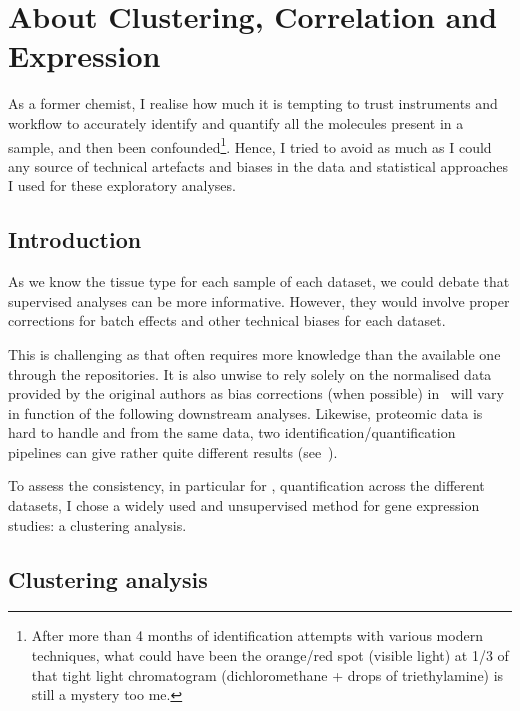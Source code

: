 \chapter{About Clustering, Correlation and Expression}
\label{ch:expression}

\begin{comment}
\setlength{\epigraphwidth}{0.45\textwidth}
\setlength{\epigraphrule}{0.1pt}
\epigraph{Quantifier: c'est convenir, puis mesurer.}{\cite{Desrosieres}}
\end{comment}

As a former chemist, I realise how much it is tempting to trust instruments and
workflow to accurately identify and quantify all the molecules present in a sample,
and then been confounded\footnote{After more than 4 months of identification
attempts with various modern techniques, what could have been the orange/red spot
(visible light) at 1/3 of that tight light chromatogram (dichloromethane + drops
of triethylamine) is still a mystery too me.}.
Hence, I tried to avoid as much as I could any source of technical
artefacts and biases in the data and statistical approaches I used for these
exploratory analyses.


\section{Introduction}

As we know the tissue type for each sample of each dataset,
we could debate that supervised analyses can be more informative.
However, they would involve proper corrections for batch effects and
other technical biases for each dataset.

This is challenging as that often requires more knowledge than the available one
through the repositories. It is also unwise to rely solely on the normalised data
provided by the original authors as bias corrections (when possible)
in \Rnaseq\ will vary in function of the following downstream analyses.
Likewise, proteomic data is hard to handle and from the same data,
two identification/quantification pipelines can give rather quite
different results (see~).

To assess the consistency, in particular for \Rnaseq, quantification across
the different datasets, I chose a widely used and unsupervised method for gene
expression studies: a clustering analysis.

\section{Clustering analysis}

